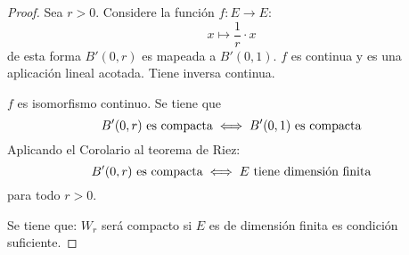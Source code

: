 \documentclass[12pt]{report}
\theoremstyle{largebreak}
\newcommand\cf[3]{\ensuremath{#1:#2\rightarrow#3}}
\begin{document}
    \begin{proof}
        Sea $r>0$. Considere la función $\cf{f}{E}{E}$:
        \begin{equation*}
            x\mapsto \frac{1}{r}\cdot x
        \end{equation*}
        de esta forma $B'(0,r)$ es mapeada a $B'(0,1)$. $f$ es continua y es una aplicación lineal acotada. Tiene inversa continua.

        $f$ es isomorfismo continuo. Se tiene que
        \begin{equation*}
            B'(0,r) \textup{ es compacta}\iff B'(0,1) \textup{ es compacta}
        \end{equation*}
        Aplicando el Corolario al teorema de Riez:
        \begin{equation*}
            B'(0,r) \textup{ es compacta}\iff E\textup{ tiene dimensión finita}
        \end{equation*}
        para todo $r>0$.

        Se tiene que: $W_r$ será compacto si $E$ es de dimensión finita es condición suficiente.


\end{proof}
\end{document}

